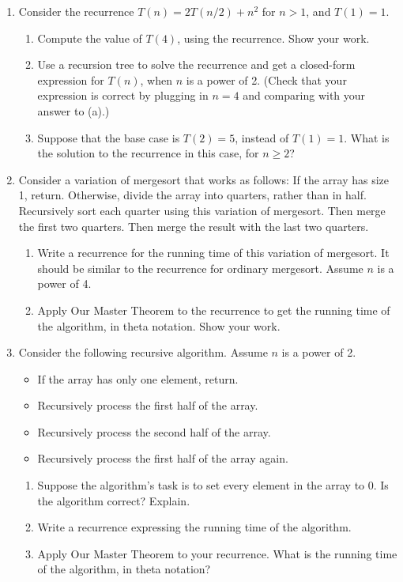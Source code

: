 \documentclass{article}
\begin{document}
\begin{enumerate}
    \item Consider the recurrence $T(n) = 2T(n/2) + n^2$ for $n > 1$, and $T(1) = 1$.
    \begin{enumerate}
        \item Compute the value of $T(4)$, using the recurrence. Show your work.
        \item Use a recursion tree to solve the recurrence and get a closed-form expression for $T(n)$, when $n$ is a power of 2. (Check that your expression is correct by plugging in $n = 4$ and comparing with your answer to (a).)
        \item Suppose that the base case is $T(2) = 5$, instead of $T(1) = 1$. What is the solution to the recurrence in this case, for $n \geq 2$?
    \end{enumerate}

    \item Consider a variation of mergesort that works as follows: If the array has size 1, return. Otherwise, divide the array into quarters, rather than in half. Recursively sort each quarter using this variation of mergesort. Then merge the first two quarters.  Then merge the result with the last two quarters.
    \begin{enumerate}
        \item Write a recurrence for the running time of this variation of mergesort. It should be similar to the recurrence for ordinary mergesort. Assume $n$ is a power of 4.
        \item Apply Our Master Theorem to the recurrence to get the running time of the algorithm, in theta notation. Show your work.
    \end{enumerate}

    \item Consider the following recursive algorithm. Assume $n$ is a power of 2.
    \begin{itemize}
        \item If the array has only one element, return.
        \item Recursively process the first half of the array.
        \item Recursively process the second half of the array.
        \item Recursively process the first half of the array again.
    \end{itemize}
    \begin{enumerate}
        \item  Suppose the algorithm's task is to set every element in the array to 0. Is the algorithm correct? Explain.
        \item Write a recurrence expressing the running time of the algorithm.
        \item Apply Our Master Theorem to your recurrence. What is the running time of the algorithm, in theta notation?
    \end{enumerate}



\end{enumerate}
\end{document}
